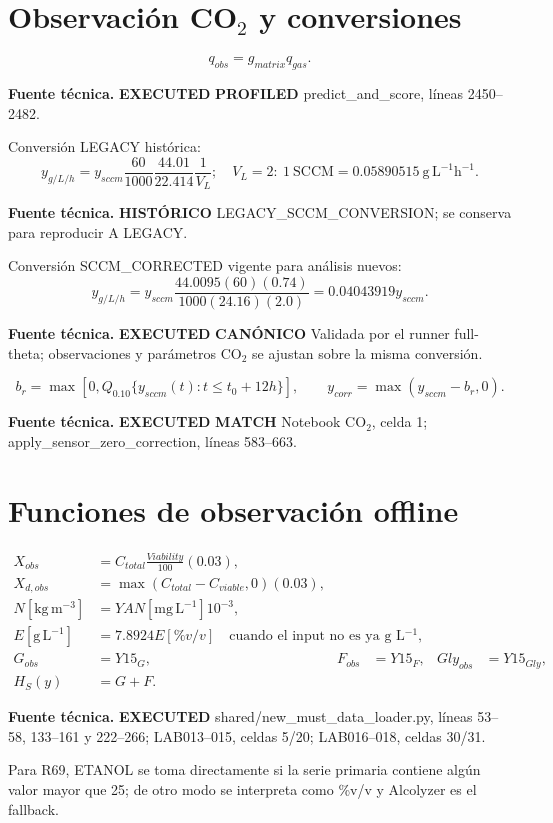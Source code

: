 \documentclass[11pt]{article}
\newcommand{\E}[1]{%
  \nobreak\hspace{0.16em}%
  \begingroup
  \setlength{\fboxsep}{1.5pt}%
  \colorbox{auditpale}{\textcolor{auditblue}{\sffamily\bfseries\scriptsize #1}}%
  \endgroup\hspace{0.16em}%
}
\newcommand{\code}[1]{{\small\ttfamily #1}}
\newcommand{\sourceinfo}[1]{%
  \par\vspace{-0.15em}%
  {\small\color{auditslate}\sffamily\textbf{Fuente técnica.}\enspace #1\par}%
  \vspace{0.25em}%
}
\begin{document}
\section{Observación CO$_2$ y conversiones}

\begin{equation}
q_{obs}=g_{matrix}q_{gas}. \tag{R62}
\end{equation}
\sourceinfo{\E{EXECUTED}\E{PROFILED} \code{predict\_and\_score}, líneas 2450--2482.}

Conversión LEGACY histórica:
\begin{equation}
y_{g/L/h}=y_{sccm}\frac{60}{1000}\frac{44.01}{22.414}\frac1{V_L};
\quad V_L=2:\ 1\mathrm{\ SCCM}=0.05890515\mathrm{\ g\,L^{-1}h^{-1}}. \tag{R63}
\end{equation}
\sourceinfo{\E{HISTÓRICO} \code{LEGACY\_SCCM\_CONVERSION}; se conserva para reproducir A LEGACY.}

Conversión SCCM\_CORRECTED vigente para análisis nuevos:
\begin{equation}
y_{g/L/h}=y_{sccm}\frac{44.0095(60)(0.74)}{1000(24.16)(2.0)}
=0.04043919y_{sccm}. \tag{R64}
\end{equation}
\sourceinfo{\E{EXECUTED}\E{CANÓNICO} Validada por el runner full-theta; observaciones y parámetros CO$_2$ se ajustan sobre la misma conversión.}

\begin{equation}
b_r=\max[0,Q_{0.10}\{y_{sccm}(t):t\le t_0+12h\}],\qquad
y_{corr}=\max(y_{sccm}-b_r,0). \tag{R65}
\end{equation}
\sourceinfo{\E{EXECUTED}\E{MATCH} Notebook CO$_2$, celda 1;
\code{apply\_sensor\_zero\_correction}, líneas 583--663.}

\section{Funciones de observación offline}

\begin{align}
X_{obs}&=C_{total}\frac{Viability}{100}(0.03), \tag{R66}\\
X_{d,obs}&=\max(C_{total}-C_{viable},0)(0.03), \tag{R67}\\
N[\mathrm{kg\,m^{-3}}]&=YAN[\mathrm{mg\,L^{-1}}]10^{-3}, \tag{R68}\\
E[\mathrm{g\,L^{-1}}]&=7.8924E[\%v/v]\quad\text{cuando el input no es ya g L$^{-1}$}, \tag{R69}\\
G_{obs}&=Y15_G,&F_{obs}&=Y15_F,&Gly_{obs}&=Y15_{Gly}, \tag{R70--R72}\\
H_S(y)&=G+F. \tag{R73}
\end{align}
\sourceinfo{\E{EXECUTED} \code{shared/new\_must\_data\_loader.py}, líneas 53--58,
133--161 y 222--266; LAB013--015, celdas 5/20; LAB016--018, celdas 30/31.}
Para R69, \code{ETANOL} se toma directamente si la serie primaria contiene
algún valor mayor que 25; de otro modo se interpreta como \%v/v y Alcolyzer es
el fallback.
\end{document}
